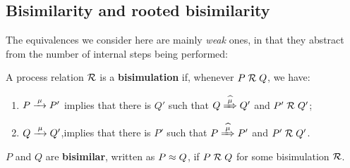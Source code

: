 \subsection{Bisimilarity and rooted bisimilarity}
\label{ss:BiEx}

The equivalences we consider here are mainly \emph{weak} ones, in that they
abstract from the number of internal steps being performed:
\begin{definition}%
\label{d:wb}
A process relation ${{\cal R}}$ is a \textbf{bisimulation} if, whenever
 $P\mathrel{\cal R} Q$, %
we have:
\begin{enumerate}
\item $P \arr\mu P'$ implies that there is $Q'$ such that $Q \Arcap \mu Q'$ and $P' \mathrel{\cal R} Q'$;\vspace{-4pt}
\item $Q \arr\mu Q'$,implies that there is $P'$ such that $P \Arcap
  \mu P'$ and $P' \mathrel{\cal R} Q'$\enspace.
\end{enumerate}  
 $P$ and $Q$ are \textbf{bisimilar},
written as $P \approx Q$, if $P \mathrel{\cal R} Q$ for some bisimulation ${\cal R}$.
\end{definition}

